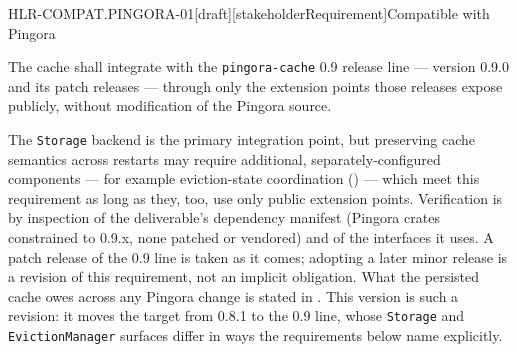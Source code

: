 \begin{requirement}{HLR-COMPAT.PINGORA-01}[draft][stakeholderRequirement]{Compatible with Pingora}


  The cache shall integrate with the \texttt{pingora-cache} 0.9 release line
  --- version 0.9.0 and its patch releases --- through only the extension
  points those releases expose publicly, without modification of the Pingora
  source.

  The \texttt{Storage} backend is the primary integration point, but
  preserving cache semantics across restarts may require additional,
  separately-configured components --- for example eviction-state coordination
  () --- which meet this requirement as long as
  they, too, use only public extension points. Verification is by inspection
  of the deliverable's dependency manifest (Pingora crates constrained to
  0.9.x, none patched or vendored) and of the interfaces it uses. A patch
  release of the 0.9 line is taken as it comes; adopting a later minor
  release is a revision of this requirement, not an implicit obligation.
  What the persisted cache owes across any Pingora change is stated in
  . This version is such a revision: it
  moves the target from 0.8.1 to the 0.9 line, whose \texttt{Storage} and
  \texttt{EvictionManager} surfaces differ in ways the requirements below name
  explicitly.



\end{requirement}
